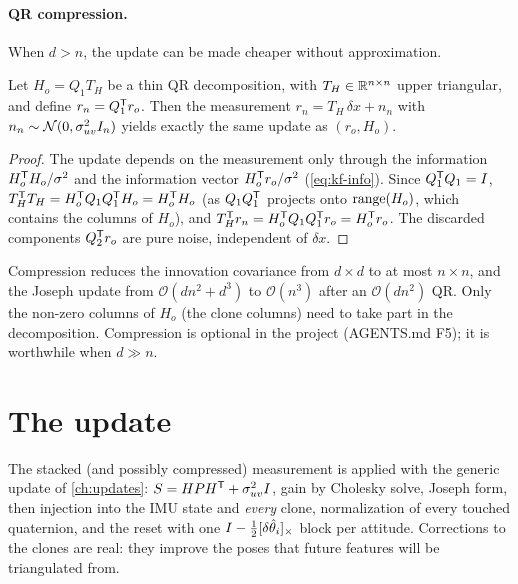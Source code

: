 \paragraph{QR compression.} When $d > n$, the update can be made cheaper without approximation.

\begin{proposition}
\label{prop:compression}
Let $H_o = Q_1T_H$ be a thin QR decomposition, with $T_H \in \mathbb{R}^{n\times n}$ upper triangular, and define $r_n = Q_1^{\mathsf{T}} r_o$. Then the
measurement $r_n = T_H\,\delta x + n_n$ with $n_n \sim \mathcal{N}(0, \sigma_{uv}^2I_n)$ yields exactly the same update as $(r_o, H_o)$.
\end{proposition}
\begin{proof}
The update depends on the measurement only through the information $H_o^{\mathsf{T}} H_o/\sigma^2$ and the information vector $H_o^{\mathsf{T}} r_o/\sigma^2$
(\cref{eq:kf-info}). Since $Q_1^{\mathsf{T}} Q_1 = I$, $T_H^{\mathsf{T}} T_H = H_o^{\mathsf{T}} Q_1Q_1^{\mathsf{T}} H_o = H_o^{\mathsf{T}} H_o$ (as $Q_1Q_1^{\mathsf{T}}$ projects onto $\operatorname{range}(H_o)$, which contains
the columns of $H_o$), and $T_H^{\mathsf{T}} r_n = H_o^{\mathsf{T}} Q_1Q_1^{\mathsf{T}} r_o = H_o^{\mathsf{T}} r_o$. The discarded components $Q_2^{\mathsf{T}} r_o$ are pure noise, independent of $\delta x$.
\end{proof}

Compression reduces the innovation covariance from $d\times d$ to at most $n\times n$, and the Joseph update from
$\mathcal{O}(dn^2 + d^3)$ to $\mathcal{O}(n^3)$ after an $\mathcal{O}(dn^2)$ QR. Only the non-zero columns of $H_o$ (the clone columns) need to
take part in the decomposition. Compression is optional in the project (AGENTS.md F5); it is worthwhile when $d \gg n$.

\section{The update}

The stacked (and possibly compressed) measurement is applied with the generic update of \cref{ch:updates}: $S = HPH^{\mathsf{T}} +
\sigma_{uv}^2I$, gain by Cholesky solve, Joseph form, then injection into the IMU state and \emph{every} clone, normalization of every
touched quaternion, and the reset with one $I - \tfrac12[\delta\hat\theta_i]_{\times}$ block per attitude. Corrections to the clones are
real: they improve the poses that future features will be triangulated from.

